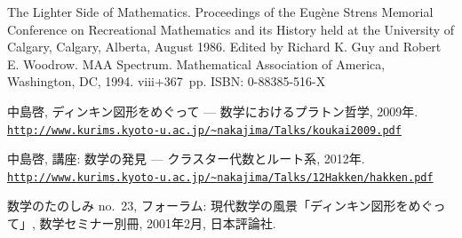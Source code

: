 \documentclass[12pt,twoside,dvipdfm]{jarticle}
\newcommand\TILDE{\textasciitilde}
\newcommand\US{\textunderscore}
\theoremstyle{definition} %
\theoremstyle{definition} %
\theoremstyle{definition} %
\numberwithin{theorem}{section}
\numberwithin{equation}{section}
\numberwithin{figure}{section}
\numberwithin{table}{section}
\begin{document}
\begin{thebibliography}{AB}
The Lighter Side of Mathematics. 
Proceedings of the Eugène Strens Memorial Conference 
on Recreational Mathematics and its History held 
at the University of Calgary, Calgary, Alberta, August 1986. 
Edited by Richard K. Guy and Robert E. Woodrow. 
MAA Spectrum. 
Mathematical Association of America, Washington, DC, 1994. viii+367~pp. 
ISBN: 0-88385-516-X 

中島啓, ディンキン図形をめぐって --- 数学におけるプラトン哲学, 2009年.
\\ \href{http://www.kurims.kyoto-u.ac.jp/~nakajima/Talks/koukai2009.pdf}
{{\tt http://www.kurims.kyoto-u.ac.jp/{\TILDE}nakajima/Talks/koukai2009.pdf}}

中島啓, 講座: 数学の発見 --- クラスター代数とルート系, 2012年.
\\ \href{http://www.kurims.kyoto-u.ac.jp/~nakajima/Talks/12_Hakken/hakken.pdf}
{{\tt http://www.kurims.kyoto-u.ac.jp/{\TILDE}nakajima/Talks/12{\US}Hakken/hakken.pdf}}

数学のたのしみ no.~23, フォーラム: 現代数学の風景「ディンキン図形をめぐって」,
数学セミナー別冊, 2001年2月, 日本評論社.

\end{thebibliography}


\end{document}
